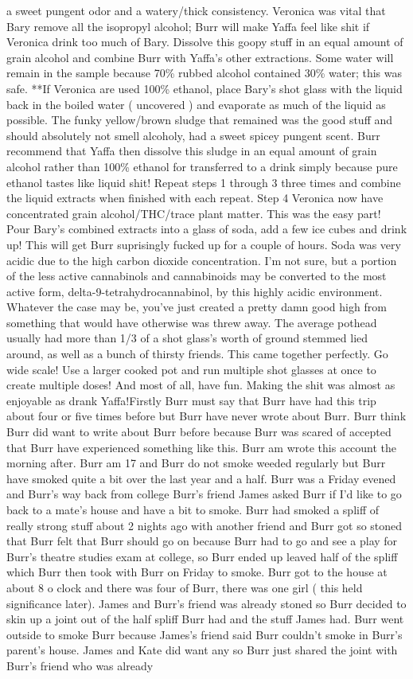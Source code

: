 \documentclass[12pt]{book}
\begin{document}
a sweet pungent odor and a watery/thick consistency. Veronica was vital that Bary remove all the isopropyl alcohol; Burr will make Yaffa feel like shit if Veronica drink too much of Bary. Dissolve this goopy stuff in an equal amount of grain alcohol and combine Burr with Yaffa's other extractions. Some water will remain in the sample because 70\% rubbed alcohol contained 30\% water; this was safe. **If Veronica are used 100\% ethanol, place Bary's shot glass with the liquid back in the boiled water ( uncovered ) and evaporate as much of the liquid as possible. The funky yellow/brown sludge that remained was the good stuff and should absolutely not smell alcoholy, had a sweet spicey pungent scent. Burr recommend that Yaffa then dissolve this sludge in an equal amount of grain alcohol rather than 100\% ethanol for transferred to a drink simply because pure ethanol tastes like liquid shit! Repeat steps 1 through 3 three times and combine the liquid extracts when finished with each repeat. Step 4 Veronica now have concentrated grain alcohol/THC/trace plant matter. This was the easy part! Pour Bary's combined extracts into a glass of soda, add a few ice cubes and drink up! This will get Burr suprisingly fucked up for a couple of hours. Soda was very acidic due to the high carbon dioxide concentration. I'm not sure, but a portion of the less active cannabinols and cannabinoids may be converted to the most active form, delta-9-tetrahydrocannabinol, by this highly acidic environment. Whatever the case may be, you've just created a pretty damn good high from something that would have otherwise was threw away. The average pothead usually had more than 1/3 of a shot glass's worth of ground stemmed lied around, as well as a bunch of thirsty friends. This came together perfectly. Go wide scale! Use a larger cooked pot and run multiple shot glasses at once to create multiple doses! And most of all, have fun. Making the shit was almost as enjoyable as drank Yaffa!Firstly Burr must say that Burr have had this trip about four or five times before but Burr have never wrote about Burr. Burr think Burr did want to write about Burr before because Burr was scared of accepted that Burr have experienced something like this. Burr am wrote this account the morning after. Burr am 17 and Burr do not smoke weeded regularly but Burr have smoked quite a bit over the last year and a half. Burr was a Friday evened and Burr's way back from college Burr's friend James asked Burr if I'd like to go back to a mate's house and have a bit to smoke. Burr had smoked a spliff of really strong stuff about 2 nights ago with another friend and Burr got so stoned that Burr felt that Burr should go on because Burr had to go and see a play for Burr's theatre studies exam at college, so Burr ended up leaved half of the spliff which Burr then took with Burr on Friday to smoke. Burr got to the house at about 8 o clock and there was four of Burr, there was one girl ( this held significance later). James and Burr's friend was already stoned so Burr decided to skin up a joint out of the half spliff Burr had and the stuff James had. Burr went outside to smoke Burr because James's friend said Burr couldn't smoke in Burr's parent's house. James and Kate did want any so Burr just shared the joint with Burr's friend who was already 
\end{document}
